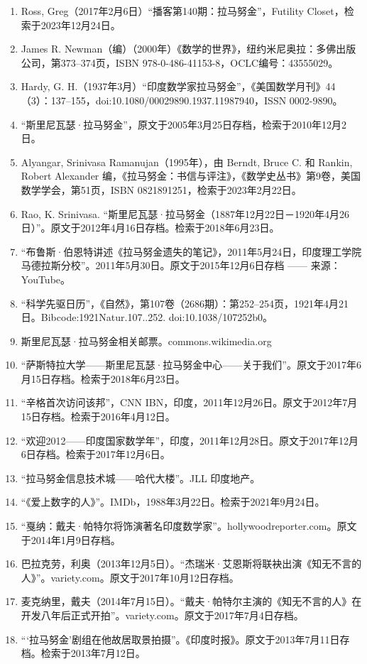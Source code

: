 \begin{enumerate}
\item Ross, Greg（2017年2月6日）“播客第140期：拉马努金”，Futility Closet，检索于2023年12月24日。
\item James R. Newman（编）（2000年）《数学的世界》，纽约米尼奥拉：多佛出版公司，第373–374页，ISBN 978-0-486-41153-8，OCLC编号：43555029。
\item Hardy, G. H.（1937年3月）“印度数学家拉马努金”，《美国数学月刊》44（3）：137–155，doi:10.1080/00029890.1937.11987940，ISSN 0002-9890。
\item “斯里尼瓦瑟·拉马努金”，原文于2005年3月25日存档，检索于2010年12月2日。
\item Alyangar, Srinivasa Ramanujan（1995年），由 Berndt, Bruce C. 和 Rankin, Robert Alexander 编，《拉马努金：书信与评注》，《数学史丛书》第9卷，美国数学学会，第51页，ISBN 0821891251，检索于2023年2月22日。
\item Rao, K. Srinivasa. “斯里尼瓦瑟·拉马努金（1887年12月22日－1920年4月26日）”。原文于2012年4月16日存档。检索于2018年6月23日。
\item “布鲁斯·伯恩特讲述《拉马努金遗失的笔记》，2011年5月24日，印度理工学院马德拉斯分校”。2011年5月30日。原文于2015年12月6日存档 —— 来源：YouTube。
\item “科学先驱日历”，《自然》，第107卷（2686期）：第252–254页，1921年4月21日。Bibcode:1921Natur.107..252. doi:10.1038/107252b0。
\item 斯里尼瓦瑟·拉马努金相关邮票。commons.wikimedia.org
\item “萨斯特拉大学——斯里尼瓦瑟·拉马努金中心——关于我们”。原文于2017年6月15日存档。检索于2018年6月23日。
\item “辛格首次访问该邦”，CNN IBN，印度，2011年12月26日。原文于2012年7月15日存档。检索于2016年4月12日。
\item “欢迎2012——印度国家数学年”，印度，2011年12月28日。原文于2017年12月6日存档。检索于2017年12月6日。
\item “拉马努金信息技术城——哈代大楼”。JLL 印度地产。
\item “《爱上数字的人》”。IMDb，1988年3月22日。检索于2021年9月24日。
\item “戛纳：戴夫·帕特尔将饰演著名印度数学家”。hollywoodreporter.com。原文于2014年1月9日存档。
\item 巴拉克劳，利奥（2013年12月5日）。“杰瑞米·艾恩斯将联袂出演《知无不言的人》”。variety.com。原文于2017年10月12日存档。
\item 麦克纳里，戴夫（2014年7月15日）。“戴夫·帕特尔主演的《知无不言的人》在开发八年后正式开拍”。variety.com。原文于2017年7月4日存档。
\item “‘拉马努金’剧组在他故居取景拍摄”。《印度时报》。原文于2013年7月11日存档。检索于2013年7月12日。

\end{enumerate}
